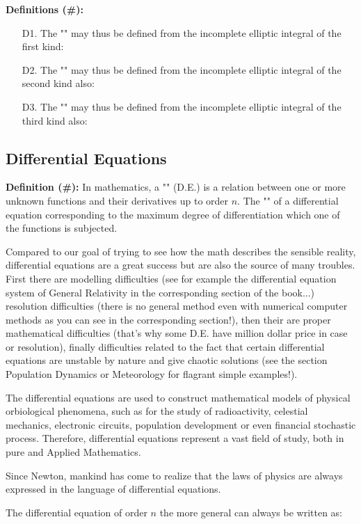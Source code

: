 	\textbf{Definitions (\#\mydef):}
	\begin{enumerate}
		\item[D1.] The "" may thus be defined from the incomplete elliptic integral of the first kind:
		
	
		\item[D2.] The "" may thus be defined from the incomplete elliptic integral of the second kind also:
		
	
		\item[D3.] The "" may thus be defined from the incomplete elliptic integral of the third kind also:
		
	\end{enumerate}
	
	\pagebreak
	\subsection{Differential Equations}
	\textbf{Definition (\#\mydef):} In mathematics, a "" (D.E.)  is a relation between one or more unknown functions and their derivatives up to order $n$. The "" of a differential equation corresponding to the maximum degree of differentiation which one of the functions is subjected.
	
	Compared to our goal of trying to see how the math describes the sensible reality, differential equations are a great success but are also the source of many troubles. First there are modelling difficulties (see for example the differential equation system of General Relativity in the corresponding section of the book...) resolution difficulties (there is no general method even with numerical computer methods as you can see in the corresponding section!), then their are proper mathematical difficulties (that's why some D.E. have million dollar price in case or resolution), finally difficulties related to the fact that certain differential equations are unstable by nature and give chaotic solutions (see the section Population Dynamics or Meteorology for flagrant simple examples!).
	
	\begin{tcolorbox}[title=Remark,colframe=black,arc=10pt]
	The differential equations are used to construct mathematical models of physical orbiological phenomena, such as for the study of radioactivity, celestial mechanics, electronic circuits, population development or even financial stochastic process. Therefore, differential equations represent a vast field of study, both in pure and Applied Mathematics.
	\end{tcolorbox}
	\begin{fquote}Since Newton, mankind has come to realize that the laws of physics are always expressed in the language of differential equations.
 	\end{fquote}
	The differential equation of order $n$ the more general can always be written as:
	
